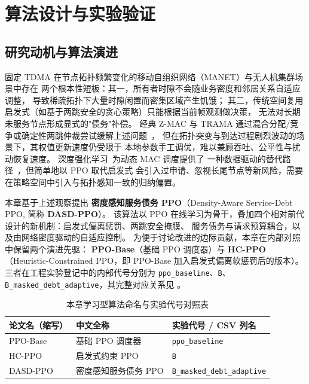 
\section{算法设计与实验验证}
\label{sec:algo-exp}

\subsection{研究动机与算法演进}
\label{subsec:motivation}

固定 TDMA 在节点拓扑频繁变化的移动自组织网络（MANET）与无人机集群场景中存在
两个根本性短板：其一，所有者时隙不会随业务密度和邻居关系自适应调整，
导致稀疏拓扑下大量时隙闲置而密集区域产生饥饿；
其二，传统空间复用启发式（如基于两跳安全的贪心策略）只能根据当前帧观测做决策，
无法对长期未服务节点形成显式的"债务"补偿。
经典 Z-MAC 与 TRAMA 通过混合分配/竞争或确定性两跳仲裁尝试缓解上述问题~\cite{zmac,trama,stdma}，
但在拓扑突变与到达过程剧烈波动的场景下，其权值更新速度仍受限于
本地参数手工调优，难以兼顾吞吐、公平性与扰动恢复速度。
深度强化学习~\cite{schulman2017ppo,sutton2018,mnih2015dqn}为动态 MAC 调度提供了
一种数据驱动的替代路径~\cite{tdma_rl_2023}，但简单地以 PPO 取代启发式
会引入过申请、忽视长尾节点等新风险，需要在策略空间中引入与拓扑感知一致的归纳偏置。

本章基于上述观察提出
\textbf{密度感知服务债务 PPO}（Density-Aware Service-Debt PPO, 简称 \textbf{DASD-PPO}）。
该算法以 PPO 在线学习为骨干，叠加四个相对前代设计的新机制：启发式偏离惩罚、两跳安全掩膜、
服务债务与请求预算耦合，以及由网络密度驱动的自适应控制。
为便于讨论改进的边际贡献，本章在内部对照中保留两个演进先驱：
\textbf{PPO-Base}（基础 PPO 调度器）与
\textbf{HC-PPO}（Heuristic-Constrained PPO，即 PPO-Base 加入启发式偏离软惩罚后的版本）。
三者在工程实验登记中的内部代号分别为 \texttt{ppo\_baseline}、\texttt{B}、
\texttt{B\_masked\_debt\_adaptive}，其完整对应关系见 。

\begin{table}[H]
\centering
\caption{本章学习型算法命名与实验代号对照表}
\label{tab:algo-naming}
\begin{tabular}{@{}lll@{}}
\toprule
\textbf{论文名}（缩写） & \textbf{中文全称} & \textbf{实验代号 / CSV 列名} \\
\midrule
PPO-Base   & 基础 PPO 调度器              & \texttt{ppo\_baseline} \\
HC-PPO     & 启发式约束 PPO               & \texttt{B} \\
DASD-PPO   & 密度感知服务债务 PPO         & \texttt{B\_masked\_debt\_adaptive} \\
\bottomrule
\end{tabular}
\end{table}

